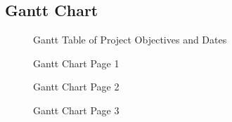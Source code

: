 \documentclass[12pt,a4paper,twoside]{report}
\begin{document}
	\begin{appendix}
	
		\listoffigures
		\newpage
		
		\section*{Gantt Chart}
		
			\begin{figure}[h!]
				\centering 
				
				\caption{Gantt Table of Project Objectives and Dates}
				\label{fig:Gantt Objectives and Dates}
			\end{figure}
		
			\newpage
			
			\begin{figure}[h!]
				\centering 
				
				\caption{Gantt Chart Page 1}
				\label{fig:Gantt Chart Page 1}
			\end{figure}
		
			\newpage
			
			\begin{figure}[h!]
				\centering 
				
				\caption{Gantt Chart Page 2}
				\label{fig:Gantt Chart Page 2}
			\end{figure}
		
			\newpage
			
			\begin{figure}[h!]
				\centering 
				
				\caption{Gantt Chart Page 3}
				\label{fig:Gantt Chart Page 3}
			\end{figure}
		
	\end{appendix}
	
\end{document}
